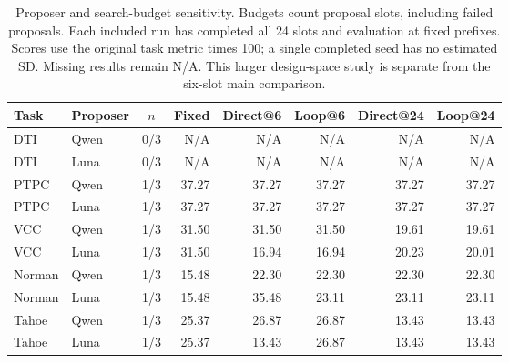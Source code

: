 \begin{table}[htbp]
\centering\small
\setlength{\tabcolsep}{4pt}
\begin{tabularx}{\linewidth}{@{}Xlcrrrrr@{}}
\toprule
Task & Proposer & $n$ & Fixed & Direct@6 & Loop@6 & Direct@24 & Loop@24 \\
\midrule
DTI & Qwen & 0/3 & N/A & N/A & N/A & N/A & N/A \\
DTI & Luna & 0/3 & N/A & N/A & N/A & N/A & N/A \\
PTPC & Qwen & 1/3 & 37.27 & 37.27 & 37.27 & 37.27 & 37.27 \\
PTPC & Luna & 1/3 & 37.27 & 37.27 & 37.27 & 37.27 & 37.27 \\
VCC & Qwen & 1/3 & 31.50 & 31.50 & 31.50 & 19.61 & 19.61 \\
VCC & Luna & 1/3 & 31.50 & 16.94 & 16.94 & 20.23 & 20.01 \\
Norman & Qwen & 1/3 & 15.48 & 22.30 & 22.30 & 22.30 & 22.30 \\
Norman & Luna & 1/3 & 15.48 & 35.48 & 23.11 & 23.11 & 23.11 \\
Tahoe & Qwen & 1/3 & 25.37 & 26.87 & 26.87 & 13.43 & 13.43 \\
Tahoe & Luna & 1/3 & 25.37 & 13.43 & 26.87 & 13.43 & 13.43 \\
\bottomrule
\end{tabularx}
\caption{Proposer and search-budget sensitivity. Budgets count proposal slots, including failed proposals. Each included run has completed all 24 slots and evaluation at fixed prefixes. Scores use the original task metric times 100; a single completed seed has no estimated SD. Missing results remain N/A. This larger design-space study is separate from the six-slot main comparison.}
\label{tab:core-budget}
\end{table}
